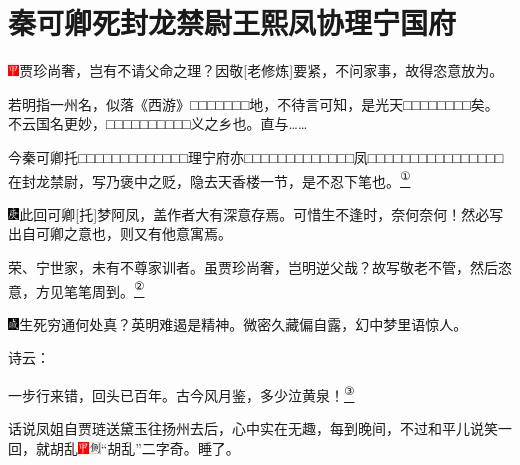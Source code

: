 

\chapter{秦可卿死封龙禁尉\hspace{.5em}王熙凤协理宁国府}

\includegraphics[width=3mm]{../Images/00002}{贾珍尚奢，岂有不请父命之理？因敬{[}老修炼{]}要紧，不问家事，故得恣意放为。}

{若明指一州名，似落《西游》□□□□□□□地，不待言可知，是光天□□□□□□□□矣。不云国名更妙，□□□□□□□□□□义之乡也。直与\ldots{}\ldots{}}

{今秦可卿托□□□□□□□□□□□□□理宁府亦□□□□□□□□□□□□□凤□□□□□□□□□□□□□□□□在封龙禁尉，写乃褒中之贬，隐去天香楼一节，是不忍下笔也。}\href{../Text/part0017_split_000.html\#lnkback_1_a}{\textsuperscript{①}}

{{\includegraphics[width=3mm]{../Images/00004}此回可卿{[}托{]}梦阿凤，盖作者大有深意存焉。可惜生不逢时，奈何奈何！然必写出自可卿之意也，则又有他意寓焉。}}

{{荣、宁世家，未有不尊家训者。虽贾珍尚奢，岂明逆父哉？故写敬老不管，然后恣意，方见笔笔周到。}}\href{../Text/part0017_split_000.html\#lnkback_2_a}{\textsuperscript{②}}

{\includegraphics[width=3mm]{../Images/00005}生死穷通何处真？英明难遏是精神。微密久藏偏自露，幻中梦里语惊人。}

诗云：

一步行来错，回头已百年。古今风月鉴，多少泣黄泉！\href{../Text/part0017_split_000.html\#lnkback_3_a}{\textsuperscript{③}}

话说凤姐自贾琏送黛玉往扬州去后，心中实在无趣，每到晚间，不过和平儿说笑一回，就胡乱{\includegraphics[width=3mm]{../Images/00002}\includegraphics[width=3mm]{../Images/00011}\footnotesize \kaishu ``胡乱''二字奇。}睡了。

